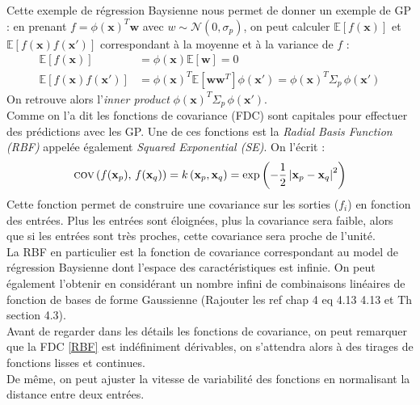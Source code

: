 \documentclass[a4paper,12pt]{report}
\newcommand{\bepar}[1]{
	\left( #1 \right)  
}
\numberwithin{equation}{section} %
\begin{document}
\noindent Cette exemple de régression Baysienne nous permet de donner un exemple de GP : en prenant $f = \phi(\textbf{x})^T\textbf{w}$ avec $w \sim \mathcal{N}\bepar{0, \sigma_p}$, on peut calculer $\mathbb{E}[f(\textbf{x})]$ et $\mathbb{E}[f(\textbf{x})f(\textbf{x}')]$ correspondant à la moyenne et à la variance de $f$ :
\begin{align*}
\mathbb{E}[f(\textbf{x})] & = \phi(\textbf{x})\mathbb{E}[\textbf{w}] = 0 \\
\mathbb{E}[f(\textbf{x})f(\textbf{x}')] & = \phi(\textbf{x})^T \mathbb{E}[\textbf{w}\textbf{w}^T]\phi(\textbf{x}') = \phi(\textbf{x})^T \Sigma_p \, \phi(\textbf{x}')
\end{align*}
On retrouve alors l'\textit{inner product} $\phi(\textbf{x})^T \Sigma_p \, \phi(\textbf{x}')$.\\
Comme on l'a dit les fonctions de covariance (FDC) sont capitales pour effectuer des prédictions avec les GP. Une de ces fonctions est la \textit{Radial Basis Function (RBF)} appelée également \textit{Squared Exponential (SE)}. On l'écrit :
\begin{equation}
 \textsc{cov}\bepar{f(\textbf{x}_p), \, f(\mathbf{x}_q)} = k\bepar{\textbf{x}_p, \textbf{x}_q} = \exp{\bepar{-\frac{1}{2}\left| \textbf{x}_p  - \textbf{x}_q\right|^2}}\label{RBF}
 \end{equation} 
Cette fonction permet de construire une covariance sur les sorties ($f_i$) en fonction des entrées. Plus les entrées sont éloignées, plus la covariance sera faible, alors que si les entrées sont très proches, cette covariance sera proche de l'unité.\\
La RBF en particulier est la fonction de covariance correspondant au model de régression Baysienne dont l'espace des caractéristiques est infinie. On peut également l'obtenir en considérant un nombre infini de combinaisons linéaires de fonction de bases de forme Gaussienne (Rajouter les ref chap 4 eq 4.13 4.13 et Th section 4.3).\\
Avant de regarder dans les détails les fonctions de covariance, on peut remarquer que la FDC \eqref{RBF} est indéfiniment dérivables, on s'attendra alors à des tirages de fonctions lisses et continues.\\
De même, on peut ajuster la vitesse de variabilité des fonctions en normalisant la distance entre deux entrées.
\end{document}

